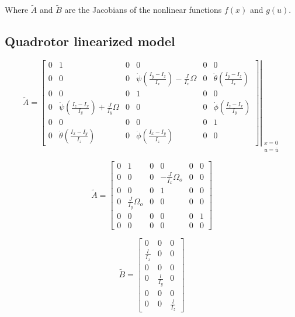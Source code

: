 \documentclass[12pt]{article}
\begin{document}
Where $\tilde{A}$ and $\tilde{B}$ are the Jacobians of the nonlinear functions $f(x)$ and $g(u)$.

\subsection{Quadrotor linearized model}

$$ \tilde{A} = 
{\left. \begin{bmatrix}
0 & 1 & 0 & 0 & 0 & 0 \\ 
0 & 0 & 0 & \dot{\psi} \left (\frac{I_y - I_z}{I_x} \right ) - \frac{J}{I_x} \Omega & 0 & \dot{\theta} \left (\frac{I_y - I_z}{I_x} \right ) \\ 
0 & 0 & 0 & 1 & 0 & 0 \\ 
0 & \dot{\psi} \left (\frac{I_z - I_x}{I_y} \right ) + \frac{J}{I_y} \Omega & 0 & 0 & 0 & \dot{\phi} \left (\frac{I_z - I_x}{I_y} \right ) \\ 
0 & 0 & 0 & 0 & 0 & 1 \\ 
0 & \dot{\theta} \left (\frac{I_x - I_y}{I_z} \right ) & 0 & \dot{\phi} \left (\frac{I_x - I_y}{I_z} \right ) & 0 & 0
\end{bmatrix} \right |}_{\begin{smallmatrix} x = 0 \\ u = \bar{u} \end{smallmatrix}} $$

\begin{equation}
\tilde{A} = 
\begin{bmatrix}
0 & 1 & 0 & 0 & 0 & 0 \\ 
0 & 0 & 0 & -\frac{J}{I_x} \Omega_o & 0 & 0 \\ 
0 & 0 & 0 & 1 & 0 & 0 \\ 
0 & \frac{J}{I_y} \Omega_o & 0 & 0 & 0 & 0 \\ 
0 & 0 & 0 & 0 & 0 & 1 \\ 
0 & 0 & 0 & 0 & 0 & 0
\end{bmatrix}
\end{equation}

\begin{equation}
\tilde{B} = 
\begin{bmatrix}
0 & 0 & 0 \\ 
\frac{l}{I_x} & 0 & 0 \\
0 & 0 & 0 \\ 
0 & \frac{l}{I_y} & 0 \\
0 & 0 & 0 \\ 
0 & 0 & \frac{l}{I_z}
\end{bmatrix}
\end{equation}
\end{document}
